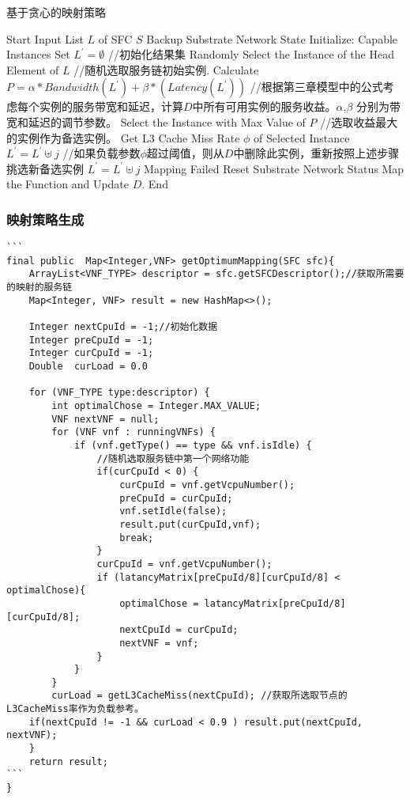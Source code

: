 \begin{algorithm} 
	\caption{基于贪心的映射策略}  
	\label{alg:greedy}  
	\begin{algorithmic} [1]
	\State Start
	\State Input List $L$ of SFC $S$
	\State Backup Substrate Network State
	\State Initialize: Capable Instances Set $L^{\prime} = \emptyset$
	\State //初始化结果集
	\State Randomly Select the Instance of the Head Element of $L$ 
	\State//随机选取服务链初始实例.
	\State Calculate $P = \alpha*Bandwidth(L^{\prime}) + \beta*(Latency(L^{\prime}))$ 
	\State//根据第三章模型中的公式考虑每个实例的服务带宽和延迟，计算$D$中所有可用实例的服务收益。$\alpha$,$\beta$ 分别为带宽和延迟的调节参数。
	\State Select the Instance with Max Value of $P$ 
	\State//选取收益最大的实例作为备选实例。
	\State Get L3 Cache Miss Rate $\phi$ of Selected Instance
	\State $L^{\prime} = L^{\prime}\uplus j$
	\State//如果负载参数$\phi$超过阈值，则从$D$中删除此实例，重新按照上述步骤挑选新备选实例
	\EndIf	
	\State $L^{\prime} = L^{\prime}\uplus j$							
	\State Mapping Failed
	\State Reset Substrate Network Status
	\Return
	\EndIf
	\EndFor
	\State Map the Function and Update $D$.
	\State End
	\end{algorithmic}  
\end{algorithm} 
\newpage

\subsubsection{映射策略生成}
\begin{lstlisting}[title=Coordinator.java, frame=shadowbox]
```
final public  Map<Integer,VNF> getOptimumMapping(SFC sfc){
	ArrayList<VNF_TYPE> descriptor = sfc.getSFCDescriptor();//获取所需要的映射的服务链
	Map<Integer, VNF> result = new HashMap<>();

	Integer nextCpuId = -1;//初始化数据
	Integer preCpuId = -1;
	Integer curCpuId = -1;
	Double  curLoad = 0.0
	
	for (VNF_TYPE type:descriptor) {
		int optimalChose = Integer.MAX_VALUE;
		VNF nextVNF = null;
		for (VNF vnf : runningVNFs) {
			if (vnf.getType() == type && vnf.isIdle) {
				//随机选取服务链中第一个网络功能
				if(curCpuId < 0) {
					curCpuId = vnf.getVcpuNumber();
					preCpuId = curCpuId;
					vnf.setIdle(false);
					result.put(curCpuId,vnf);
					break;
				}
				curCpuId = vnf.getVcpuNumber();
				if (latancyMatrix[preCpuId/8][curCpuId/8] < optimalChose){
					optimalChose = latancyMatrix[preCpuId/8][curCpuId/8];
					nextCpuId = curCpuId;
					nextVNF = vnf;
				}
			}
		}
		curLoad = getL3CacheMiss(nextCpuId); //获取所选取节点的L3CacheMiss率作为负载参考。
	if(nextCpuId != -1 && curLoad < 0.9 ) result.put(nextCpuId, nextVNF);
	}
	return result;
```
}
\end{lstlisting}

